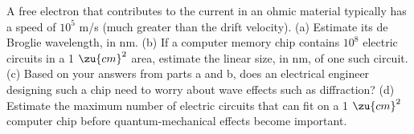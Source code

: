 A free electron that contributes to the current in an
ohmic material typically has a speed of $10^5$  m/s (much
greater than the drift velocity).\hwendpart
(a) Estimate its de Broglie wavelength, in nm.\answercheck\hwendpart
(b) If a computer memory chip contains $10^8$  electric
circuits in a 1 $\zu{cm}^2$ area, estimate the linear size, in
nm, of one such circuit.\answercheck\hwendpart
(c) Based on your answers from parts a and b, does an
electrical engineer designing such a chip need to worry
about wave effects such as diffraction?\hwendpart
(d) Estimate the maximum number of electric circuits that
can fit on a 1 $\zu{cm}^2$ computer chip before quantum-mechanical
effects become important.
